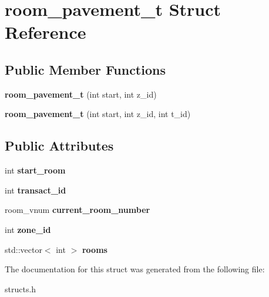 \hypertarget{structroom__pavement__t}{}\section{room\+\_\+pavement\+\_\+t Struct Reference}
\label{structroom__pavement__t}
\subsection*{Public Member Functions}
\begin{DoxyCompactItemize}
\item 
\mbox{\label{structroom__pavement__t_a7ac07d27bca5db40cbd547c4412b2c3a}} 
{\bfseries room\+\_\+pavement\+\_\+t} (int start, int z\+\_\+id)
\item 
\mbox{\label{structroom__pavement__t_a28666062a37e45d08762bc382e44bf16}} 
{\bfseries room\+\_\+pavement\+\_\+t} (int start, int z\+\_\+id, int t\+\_\+id)
\end{DoxyCompactItemize}
\subsection*{Public Attributes}
\begin{DoxyCompactItemize}
\item 
\mbox{\label{structroom__pavement__t_abca4996886fda065dfa5a214da342d3e}} 
int {\bfseries start\+\_\+room}
\item 
\mbox{\label{structroom__pavement__t_a3f031a3a362fc944163567a0cbc8ffa3}} 
int {\bfseries transact\+\_\+id}
\item 
\mbox{\label{structroom__pavement__t_a2737aa06ca5ebaa8f26be0b88bea1e5a}} 
room\+\_\+vnum {\bfseries current\+\_\+room\+\_\+number}
\item 
\mbox{\label{structroom__pavement__t_af722256a287d596aef1df969b4869b5b}} 
int {\bfseries zone\+\_\+id}
\item 
\mbox{\label{structroom__pavement__t_a3874622b195e8dc58cb25e1a1fecdfa3}} 
std\+::vector$<$ int $>$ {\bfseries rooms}
\end{DoxyCompactItemize}


The documentation for this struct was generated from the following file\+:\begin{DoxyCompactItemize}
\item 
structs.\+h\end{DoxyCompactItemize}
